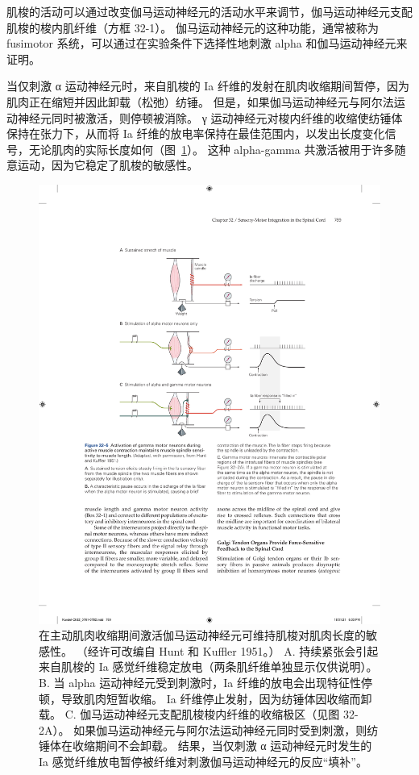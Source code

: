 肌梭的活动可以通过改变伽马运动神经元的活动水平来调节，伽马运动神经元支配肌梭的梭内肌纤维（方框 32-1）。
伽马运动神经元的这种功能，通常被称为 fusimotor 系统，可以通过在实验条件下选择性地刺激 alpha 和伽马运动神经元来证明。


当仅刺激 α 运动神经元时，来自肌梭的 Ia 纤维的发射在肌肉收缩期间暂停，因为肌肉正在缩短并因此卸载（松弛）纺锤。
但是，如果伽马运动神经元与阿尔法运动神经元同时被激活，则停顿被消除。
γ 运动神经元对梭内纤维的收缩使纺锤体保持在张力下，从而将 Ia 纤维的放电率保持在最佳范围内，以发出长度变化信号，无论肌肉的实际长度如何（图~\ref{fig:32_5}）。 
这种 alpha-gamma 共激活被用于许多随意运动，因为它稳定了肌梭的敏感性。


\begin{figure}[htbp]
	\centering
	\includegraphics[width=0.75\linewidth]{chap32/fig_32_5}
	\caption{在主动肌肉收缩期间激活伽马运动神经元可维持肌梭对肌肉长度的敏感性。 
	（经许可改编自 Hunt 和 Kuffler 1951。） 
	A. 持续紧张会引起来自肌梭的 Ia 感觉纤维稳定放电（两条肌纤维单独显示仅供说明）。 
	B. 当 alpha 运动神经元受到刺激时，Ia 纤维的放电会出现特征性停顿，导致肌肉短暂收缩。 Ia 纤维停止发射，因为纺锤体因收缩而卸载。
	C. 伽马运动神经元支配肌梭梭内纤维的收缩极区（见图 32-2A）。
	如果伽马运动神经元与阿尔法运动神经元同时受到刺激，则纺锤体在收缩期间不会卸载。
	结果，当仅刺激 α 运动神经元时发生的 Ia 感觉纤维放电暂停被纤维对刺激伽马运动神经元的反应“填补”。}
	\label{fig:32_5}
\end{figure}


